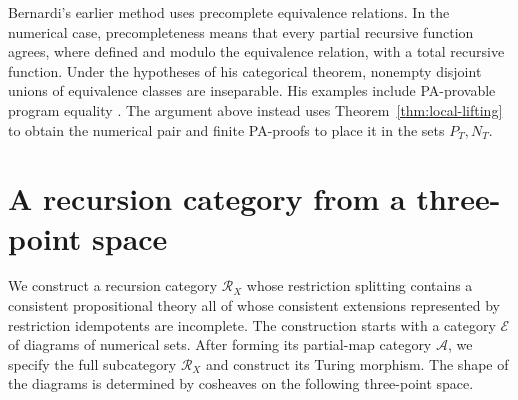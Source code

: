 \documentclass[11pt]{article}
\begin{document}
Bernardi's earlier method uses precomplete equivalence relations.
In the numerical case, precompleteness means that every partial
recursive function agrees, where defined and modulo the equivalence
relation, with a total recursive function. Under the hypotheses of
his categorical theorem, nonempty disjoint unions of equivalence
classes are inseparable. His examples include PA-provable program
equality \cite[pp.~125--128]{Bernardi}. The argument above instead
uses Theorem~\ref{thm:local-lifting} to obtain the numerical pair and
finite PA-proofs to place it in the sets $P_T,N_T$.

\section{A recursion category from a three-point space}\label{sec:cosheaves}

We construct a recursion category $\mathscr R_X$ whose restriction
splitting contains a consistent propositional theory all of whose
consistent extensions represented by restriction idempotents are
incomplete. The construction
starts with a category $\mathcal E$ of diagrams of numerical sets.
After forming its partial-map category $\mathcal A$, we specify the
full subcategory $\mathscr R_X$ and construct its Turing morphism.
The shape of the diagrams is determined by cosheaves on the following
three-point space.
\end{document}
